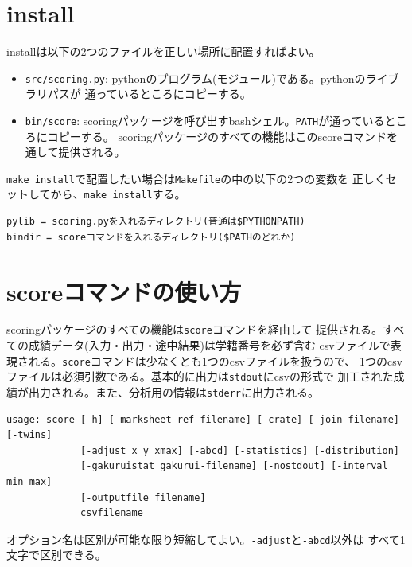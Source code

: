 \section{install}
\label{install}

installは以下の2つのファイルを正しい場所に配置すればよい。

\begin{itemize}
\item \texttt{src\slash scoring.py}: pythonのプログラム(モジュール)である。pythonのライブラリパスが
通っているところにコピーする。

\item \texttt{bin\slash score}: scoringパッケージを呼び出すbashシェル。\texttt{PATH}が通っているところにコピーする。
scoringパッケージのすべての機能はこのscoreコマンドを通して提供される。

\end{itemize}

\texttt{make install}で配置したい場合は\texttt{Makefile}の中の以下の2つの変数を
正しくセットしてから、\texttt{make install}する。
\begin{tcolorbox}[enhanced jigsaw,breakable,colframe=\mycolor ,colback=white,colbacktitle=\mycolor ,coltitle=white,fonttitle=\bfseries\sffamily]

\begin{verbatim}
pylib = scoring.pyを入れるディレクトリ(普通は$PYTHONPATH)
bindir = scoreコマンドを入れるディレクトリ($PATHのどれか)
\end{verbatim}

\end{tcolorbox}

\section{scoreコマンドの使い方}
\label{scoreコマンドの使い方}

scoringパッケージのすべての機能は\texttt{score}コマンドを経由して
提供される。すべての成績データ(入力・出力・途中結果)は学籍番号を必ず含む
csvファイルで表現される。\texttt{score}コマンドは少なくとも1つのcsvファイルを扱うので、
1つのcsvファイルは必須引数である。基本的に出力は\texttt{stdout}にcsvの形式で
加工された成績が出力される。また、分析用の情報は\texttt{stderr}に出力される。
\begin{tcolorbox}[enhanced jigsaw,breakable,colframe=\mycolor ,colback=white,colbacktitle=\mycolor ,coltitle=white,fonttitle=\bfseries\sffamily,title=\texttt{\$ score -h}]

\begin{verbatim}
usage: score [-h] [-marksheet ref-filename] [-crate] [-join filename] [-twins]
             [-adjust x y xmax] [-abcd] [-statistics] [-distribution]
             [-gakuruistat gakurui-filename] [-nostdout] [-interval min max]
             [-outputfile filename]
             csvfilename
\end{verbatim}

\end{tcolorbox}
オプション名は区別が可能な限り短縮してよい。\texttt{-adjust}と\texttt{-abcd}以外は
すべて1文字で区別できる。

